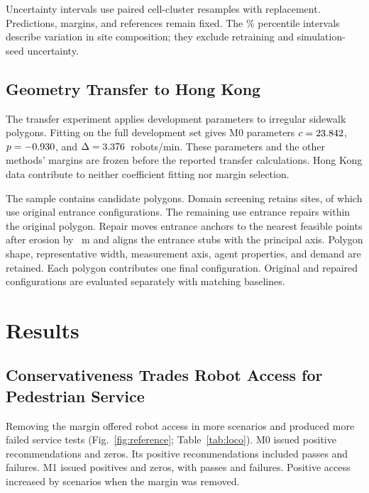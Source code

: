 \documentclass[NewProceedings,letterpaper]{ascelike-new}
\begin{document}
Uncertainty intervals use \BootstrapN{} paired cell-cluster resamples with replacement. Predictions, margins, and references remain fixed. The \ConfidenceLevel{}\% percentile intervals describe variation in site composition; they exclude retraining and simulation-seed uncertainty.

\subsection{Geometry Transfer to Hong Kong}
The transfer experiment applies development parameters to irregular sidewalk polygons. Fitting on the full development set gives M0 parameters $c=23.842{}$, $p=-0.930{}$, and $\Delta=3.376{}$~robots/min. These parameters and the other methods' margins are frozen before the reported transfer calculations. Hong Kong data contribute to neither coefficient fitting nor margin selection.

The sample contains \HKCandidates{} candidate polygons. Domain screening retains \HKTotalN{} sites, of which \HKOriginalN{} use original entrance configurations. The remaining \HKRepairedN{} use entrance repairs within the original polygon. Repair moves entrance anchors to the nearest feasible points after erosion by \RepairClearance{}~m and aligns the entrance stubs with the principal axis. Polygon shape, representative width, measurement axis, agent properties, and demand are retained. Each polygon contributes one final configuration. Original and repaired configurations are evaluated separately with matching baselines.

\section{Results}
\subsection{Conservativeness Trades Robot Access for Pedestrian Service}
Removing the margin offered robot access in more scenarios and produced more failed service tests (Fig.~\ref{fig:reference}; Table~\ref{tab:loco}). M0 issued \MZeroPositive{} positive recommendations and \MZeroZero{} zeros. Its positive recommendations included \MZeroPass{} passes and \MZeroFail{} failures. M1 issued \MOnePositive{} positives and \MOneZero{} zeros, with \MOnePass{} passes and \MOneFail{} failures. Positive access increased by \AccessDifference{} scenarios when the margin was removed.
\end{document}
